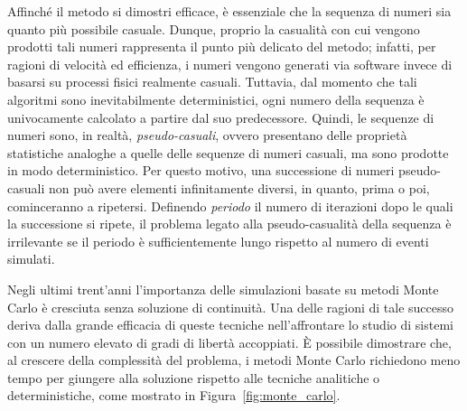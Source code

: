Affinché il metodo si dimostri efficace, è essenziale che la sequenza di numeri sia quanto più possibile casuale.
Dunque, proprio la casualità con cui vengono prodotti tali numeri rappresenta il punto più delicato del metodo; infatti, per ragioni di velocità ed efficienza, i numeri vengono generati via software invece di basarsi su processi fisici realmente casuali.
Tuttavia, dal momento che tali algoritmi sono inevitabilmente deterministici, ogni numero della sequenza è univocamente calcolato a partire dal suo predecessore. 
Quindi, le sequenze di numeri sono, in realtà, \emph{pseudo-casuali}, ovvero presentano delle proprietà statistiche analoghe a quelle delle sequenze di numeri casuali, ma sono prodotte in modo deterministico. 
Per questo motivo, una successione di numeri pseudo-casuali non può avere elementi infinitamente diversi, in quanto, prima o poi, cominceranno a ripetersi.
Definendo \emph{periodo} il numero di iterazioni dopo le quali la successione si ripete, il problema legato alla pseudo-casualità della sequenza è irrilevante se il periodo è sufficientemente lungo rispetto al numero di eventi simulati.


Negli ultimi trent'anni l'importanza delle simulazioni basate su metodi Monte Carlo è cresciuta senza soluzione di continuità. 
Una delle ragioni di tale successo deriva dalla grande efficacia di queste tecniche nell'affrontare lo studio di sistemi con un numero elevato di gradi di libertà accoppiati. 
È possibile dimostrare che, al crescere della complessità del problema, i metodi Monte Carlo richiedono meno tempo per giungere alla soluzione rispetto alle tecniche analitiche o deterministiche, come mostrato in Figura~\ref{fig:monte_carlo}.


